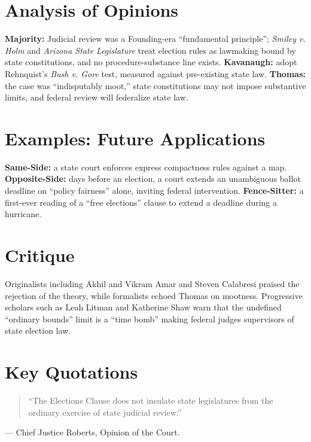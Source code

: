 \documentclass[12pt]{article}
\begin{document}
\section{Analysis of Opinions}
\textbf{Majority:} Judicial review was a Founding-era ``fundamental principle''; \textit{Smiley v. Holm} and \textit{Arizona State Legislature} treat election rules as lawmaking bound by state constitutions, and no procedure-substance line exists. \textbf{Kavanaugh:} adopt Rehnquist's \textit{Bush v. Gore} test, measured against pre-existing state law. \textbf{Thomas:} the case was ``indisputably moot,'' state constitutions may not impose substantive limits, and federal review will federalize state law.

\section{Examples: Future Applications}
\textbf{Same-Side:} a state court enforces express compactness rules against a map. \textbf{Opposite-Side:} days before an election, a court extends an unambiguous ballot deadline on ``policy fairness'' alone, inviting federal intervention. \textbf{Fence-Sitter:} a first-ever reading of a ``free elections'' clause to extend a deadline during a hurricane.

\section{Critique}
Originalists including Akhil and Vikram Amar and Steven Calabresi praised the rejection of the theory, while formalists echoed Thomas on mootness. Progressive scholars such as Leah Litman and Katherine Shaw warn that the undefined ``ordinary bounds'' limit is a ``time bomb'' making federal judges supervisors of state election law.

\section{Key Quotations}
\begin{quote}
``The Elections Clause does not insulate state legislatures from the ordinary exercise of state judicial review.''
\end{quote}
\noindent --- Chief Justice Roberts, Opinion of the Court.
\end{document}
